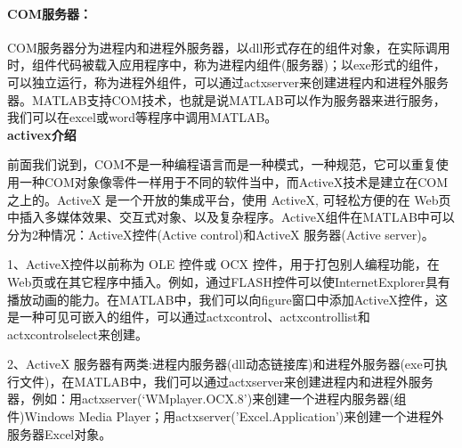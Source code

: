             \paragraph{COM服务器：}COM服务器分为进程内和进程外服务器，以dll形式存在的组件对象，在实际调用时，组件代码被载入应用程序中，称为进程内组件(服务器)；以exe形式的组件，可以独立运行，称为进程外组件，可以通过actxserver来创建进程内和进程外服务器。MATLAB支持COM技术，也就是说MATLAB可以作为服务器来进行服务，我们可以在excel或word等程序中调用MATLAB。\\
            \textbf{activex介绍}
            \par
            前面我们说到，COM不是一种编程语言而是一种模式，一种规范，它可以重复使用一种COM对象像零件一样用于不同的软件当中，而ActiveX技术是建立在COM之上的。ActiveX 是一个开放的集成平台，使用 ActiveX, 可轻松方便的在 Web页中插入多媒体效果、交互式对象、以及复杂程序。ActiveX组件在MATLAB中可以分为2种情况：ActiveX控件(Active control)和ActiveX 服务器(Active server)。
            \par
            1、ActiveX控件以前称为 OLE 控件或 OCX 控件，用于打包别人编程功能，在 Web页或在其它程序中插入。例如，通过FLASH控件可以使InternetExplorer具有播放动画的能力。在MATLAB中，我们可以向figure窗口中添加ActiveX控件，这是一种可见可嵌入的组件，可以通过actxcontrol、actxcontrollist和actxcontrolselect来创建。
            \par
            2、ActiveX 服务器有两类:进程内服务器(dll动态链接库)和进程外服务器(exe可执行文件)，在MATLAB中，我们可以通过actxserver来创建进程内和进程外服务器，例如：用actxserver(‘WMplayer.OCX.8’)来创建一个进程内服务器(组件)Windows Media Player；用actxserver('Excel.Application')来创建一个进程外服务器Excel对象。
